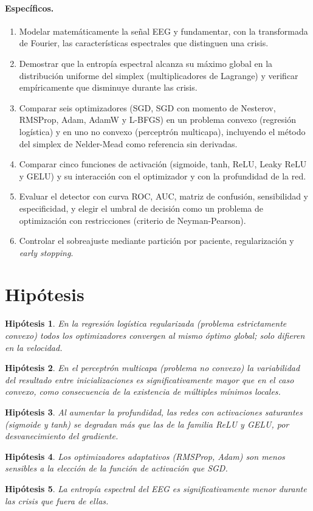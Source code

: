 \documentclass[11pt]{article}
\newtheorem{hipotesis}{Hipótesis}
\begin{document}
\paragraph{Específicos.}
\begin{enumerate}
  \item Modelar matemáticamente la señal EEG y fundamentar, con la transformada de Fourier, las características espectrales que distinguen una crisis.
  \item Demostrar que la entropía espectral alcanza su máximo global en la distribución uniforme del simplex (multiplicadores de Lagrange) y verificar empíricamente que disminuye durante las crisis.
  \item Comparar seis optimizadores (SGD, SGD con momento de Nesterov, RMSProp, Adam, AdamW y L-BFGS) en un problema convexo (regresión logística) y en uno no convexo (perceptrón multicapa), incluyendo el método del simplex de Nelder-Mead como referencia sin derivadas.
  \item Comparar cinco funciones de activación (sigmoide, tanh, ReLU, Leaky ReLU y GELU) y su interacción con el optimizador y con la profundidad de la red.
  \item Evaluar el detector con curva ROC, AUC, matriz de confusión, sensibilidad y especificidad, y elegir el umbral de decisión como un problema de optimización con restricciones (criterio de Neyman-Pearson).
  \item Controlar el sobreajuste mediante partición por paciente, regularización y \emph{early stopping}.
\end{enumerate}

\section{Hipótesis}

\begin{hipotesis}
En la regresión logística regularizada (problema estrictamente convexo) todos los optimizadores convergen al mismo óptimo global; solo difieren en la velocidad.
\end{hipotesis}
\begin{hipotesis}
En el perceptrón multicapa (problema no convexo) la variabilidad del resultado entre inicializaciones es significativamente mayor que en el caso convexo, como consecuencia de la existencia de múltiples mínimos locales.
\end{hipotesis}
\begin{hipotesis}
Al aumentar la profundidad, las redes con activaciones saturantes (sigmoide y tanh) se degradan más que las de la familia ReLU y GELU, por desvanecimiento del gradiente.
\end{hipotesis}
\begin{hipotesis}
Los optimizadores adaptativos (RMSProp, Adam) son menos sensibles a la elección de la función de activación que SGD.
\end{hipotesis}
\begin{hipotesis}
La entropía espectral del EEG es significativamente menor durante las crisis que fuera de ellas.
\end{hipotesis}
\end{document}
